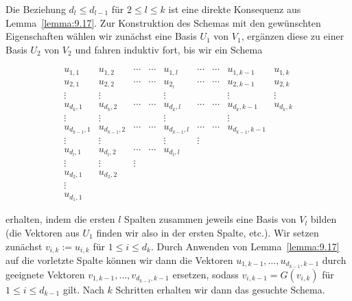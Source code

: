 \begin{beweis}
	Die Beziehung $d_l \leq d_{l-1}$ für $2 \leq l \leq k$ ist eine direkte Konsequenz aus Lemma~\ref{lemma:9.17}.
	Zur Konstruktion des Schemas mit den gewünschten Eigenschaften wählen wir zunächst eine Basis $U_1$ von $V_1$, ergänzen diese zu einer Basis $U_2$ von $V_2$ und fahren induktiv fort, bis wir ein Schema
	
	\[
		\begin{array}{ccccccccc}
		u_{1,1} & u_{1,2} & \cdots & \cdots & u_{1,l} & \cdots & \cdots & u_{1,k-1} & u_{1,k} \\ 
		u_{2,1} & u_{2,2} & \cdots & \cdots & u_{2_l} & \cdots & \cdots & u_{2,k-1} & u_{2,k} \\ 
		\vdots & \vdots &  &  & \vdots &  &  & \vdots & \vdots \\ 
		u_{d_k,1} & u_{d_k,2} & \cdots & \cdots & u_{d_k,l} & \cdots & \cdots & u_{d_k,k-1} & u_{d_k,k} \\ 
		\vdots & \vdots &  &  & \vdots &  &  & \vdots &  \\ 
		u_{d_{k-1},1} & u_{d_{k-1},2} & \cdots & \cdots & u_{d_{k-1},l} & \cdots & \cdots & u_{d_{k-1},k-1} &  \\ 
		\vdots & \vdots &  &  & \vdots & \vdots &  &  &  \\ 
		u_{d_l,1} & u_{d_l,2} & \cdots & \cdots & u_{d_l,l} &  &  &  &  \\ 
		\vdots & \vdots & \vdots &  &  &  &  &  &  \\ 
		u_{d_2,1} & u_{d_2,2} &  &  &  &  &  &  &  \\
		\vdots & & & & & & & & \\ 
		u_{d_1,1} &  &  &  &  &  &  &  & 
		\end{array}
	\]
	
	erhalten, indem die ersten $l$ Spalten zusammen jeweils eine Basis von $V_l$ bilden (die Vektoren aus $U_1$ finden wir also in der ersten Spalte, etc.).
	Wir setzen zunächst $v_{i,k} := u_{i,k}$ für $1 \leq i \leq d_k$.
	Durch Anwenden von Lemma~\ref{lemma:9.17} auf die vorletzte Spalte können wir dann die Vektoren $u_{1,k-1},\dots,u_{d_{k-1},k-1}$ durch geeignete Vektoren $v_{1,k-1},\dots,v_{d_{k-1},k-1}$ ersetzen, sodass $v_{i,k-1} = G(v_{i,k})$ für $1 \leq i \leq d_{k-1}$ gilt.
	Nach $k$ Schritten erhalten wir dann das gesuchte Schema.
	

\end{beweis}
